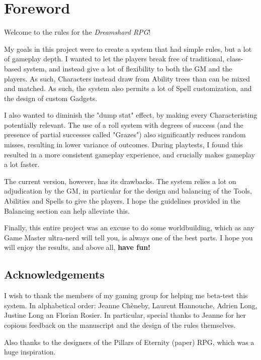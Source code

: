 \chapter*{Foreword}

Welcome to the rules for the \textit{Dreamshard RPG}!

My goals in this project were to create a system that had simple rules, but a lot of gameplay depth. I wanted to let the players break free of traditional, class-based system, and instead give a lot of flexibility to both the GM and the players. As such, Characters instead draw from Ability trees than can be mixed and matched. As such, the system also permits a lot of Spell customization, and the design of custom Gadgets. 

I also wanted to diminish the "dump stat" effect, by making every Characteristing potentially relevant. The use of a roll system with degrees of success (and the presence of partial successes called "Grazes") also significantly reduces random misses, resulting in lower variance of outcomes. During playtests, I found this resulted in a more consistent gameplay experience, and crucially makes gameplay a lot faster.

The current version, however, has its drawbacks. The system relies a lot on adjudication by the GM, in particular for the design and balancing of the Tools, Abilities and Spells to give the players. I hope the guidelines provided in the Balancing section can help alleviate this.

Finally, this entire project was an excuse to do some worldbuilding, which as any Game Master ultra-nerd will tell you, is always one of the best parts. I hope you will enjoy the results, and above all, \textbf{have fun!}



\section*{Acknowledgements}

I wish to thank the members of my gaming group for helping me beta-test this system. In alphabetical order: Jeanne Chèneby, Laurent Hannouche, Adrien Long, Justine Long an Florian Rosier. In particular, special thanks to Jeanne for her copious feedback on the manuscript and the design of the rules themselves.

Also thanks to the designers of the Pillars of Eternity (paper) RPG, which was a huge inspiration.

